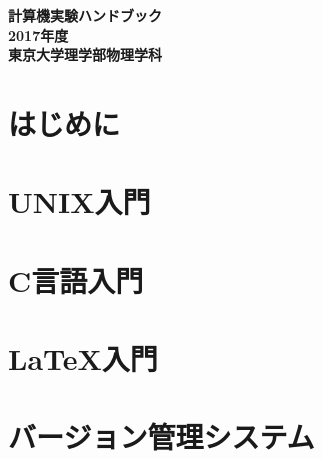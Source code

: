 \documentclass[a4j]{jsbook}
\newcommand{\nendo}{2017}
\begin{document}
\thispagestyle{empty}
\pagestyle{empty}
\begin{titlepage}
\vspace*{5cm}
\begin{center}
{\Huge\bf 計算機実験ハンドブック}\\
\vspace*{14cm}
{\LARGE\bf \nendo 年度}\\
\vspace{1.0cm}
{\LARGE\bf 東京大学理学部物理学科}
\end{center}
\end{titlepage}
\clearpage
\pagestyle{plain}
\cleardoublepage

\setcounter{page}{1}
\tableofcontents
\cleardoublepage

\chapter{はじめに}


\chapter{UNIX入門}


\chapter{C言語入門}


\chapter{\LaTeX 入門}


\chapter{バージョン管理システム}


%


%
\end{document}
